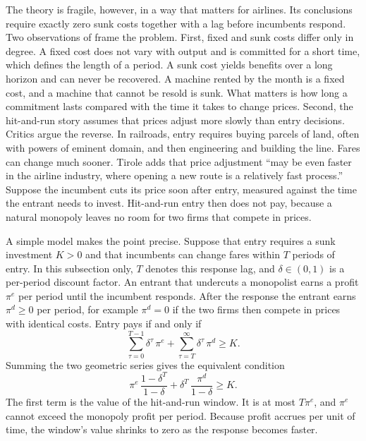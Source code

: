 The theory is fragile, however, in a way that matters for airlines. Its conclusions require exactly zero sunk
costs together with a lag before incumbents respond. Two observations of \citet[secs.~8.1.1--8.1.2]{Tirole1988}
frame the problem. First, fixed and sunk costs differ only in degree. A fixed cost does not vary
with output and is committed for a short time, which defines the length of a period. A sunk cost yields
benefits over a long horizon and can never be recovered. A machine rented by the month is a fixed cost, and a
machine that cannot be resold is sunk. What matters is how long a commitment lasts compared with the time it
takes to change prices. Second, the hit-and-run story assumes that prices adjust more slowly than entry
decisions. Critics argue the reverse. In railroads, entry requires buying parcels of land, often with powers
of eminent domain, and then engineering and building the line. Fares can change much sooner. Tirole adds
that price adjustment ``may be even faster in the airline industry, where opening a new route is a relatively
fast process.'' Suppose the incumbent cuts its price soon after entry, measured against the time the entrant
needs to invest. Hit-and-run entry then does not pay, because a natural monopoly leaves no room for two firms
that compete in prices.

A simple model makes the point precise. Suppose that entry requires a sunk investment
$K > 0$ and that incumbents can change fares within $T$ periods of entry. In this subsection only, $T$ denotes
this response lag, and $\delta \in (0,1)$ is a per-period discount factor. An entrant that undercuts a
monopolist earns a profit $\pi^e$ per period until the incumbent responds. After the response the entrant earns
$\pi^d \ge 0$ per period, for example $\pi^d = 0$ if the two firms then compete in prices with identical
costs. Entry pays if and only if
\begin{equation}\label{eq:09-hitrun}
  \sum_{\tau=0}^{T-1} \delta^{\tau}\,\pi^e + \sum_{\tau=T}^{\infty} \delta^{\tau}\,\pi^d \ge K .
\end{equation}
Summing the two geometric series gives the equivalent condition
\begin{equation}\label{eq:09-hitrun-closed}
  \pi^e\,\frac{1 - \delta^{T}}{1 - \delta} + \delta^{T}\,\frac{\pi^d}{1 - \delta} \ge K .
\end{equation}
The first term is the value of the hit-and-run window. It is at most $T\pi^e$, and $\pi^e$ cannot exceed the
monopoly profit per period. Because profit accrues per unit of time, the window's value shrinks to zero as the
response becomes faster.

